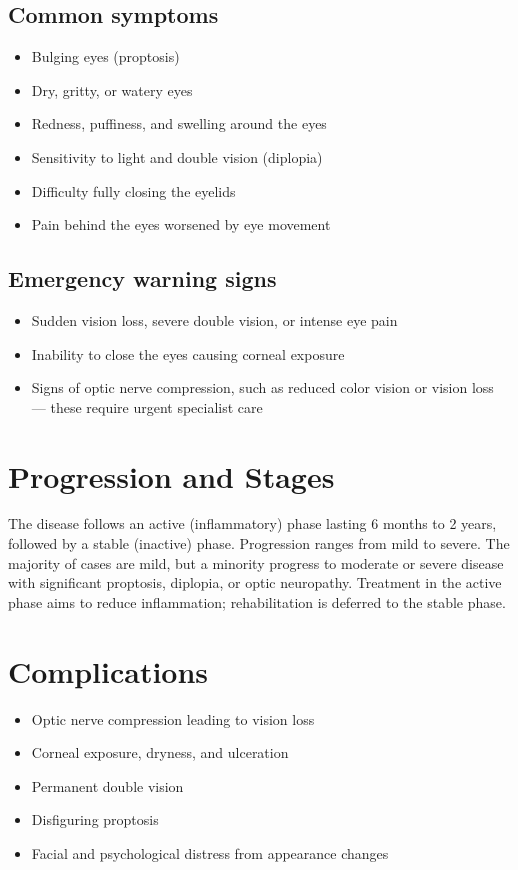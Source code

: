 \subsection{Common symptoms}
\begin{itemize}[noitemsep]
  \item Bulging eyes (proptosis)
  \item Dry, gritty, or watery eyes
  \item Redness, puffiness, and swelling around the eyes
  \item Sensitivity to light and double vision (diplopia)
  \item Difficulty fully closing the eyelids
  \item Pain behind the eyes worsened by eye movement
\end{itemize}
\subsection{Emergency warning signs}
\begin{itemize}[noitemsep]
  \item Sudden vision loss, severe double vision, or intense eye pain
  \item Inability to close the eyes causing corneal exposure
  \item Signs of optic nerve compression, such as reduced color vision or vision loss --- these require urgent specialist care
\end{itemize}
\section{Progression and Stages}
The disease follows an active (inflammatory) phase lasting 6 months to 2 years, followed by a stable (inactive) phase. Progression ranges from mild to severe. The majority of cases are mild, but a minority progress to moderate or severe disease with significant proptosis, diplopia, or optic neuropathy. Treatment in the active phase aims to reduce inflammation; rehabilitation is deferred to the stable phase.
\section{Complications}
\begin{itemize}[noitemsep]
  \item Optic nerve compression leading to vision loss
  \item Corneal exposure, dryness, and ulceration
  \item Permanent double vision
  \item Disfiguring proptosis
  \item Facial and psychological distress from appearance changes
\end{itemize}

